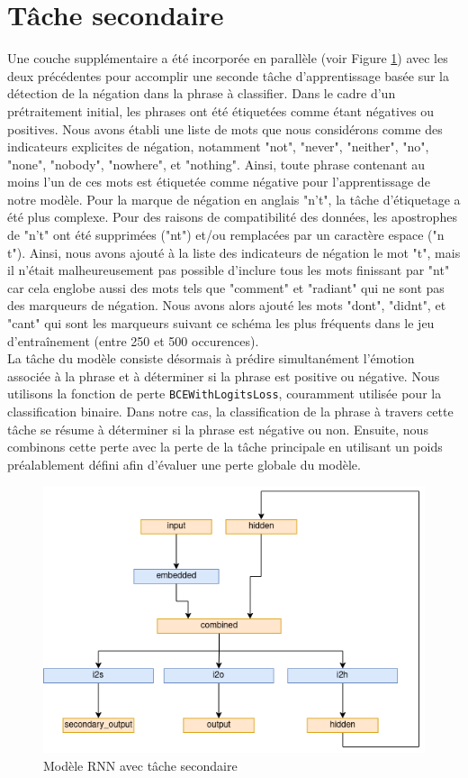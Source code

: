 \documentclass{article}
\begin{document}
\section{Tâche secondaire}
Une couche supplémentaire a été incorporée en parallèle (voir Figure \ref{fig:modele_rnn_with_secondary}) avec les deux précédentes pour accomplir une seconde tâche d'apprentissage basée sur la détection de la négation dans la phrase à classifier. Dans le cadre d'un prétraitement initial, les phrases ont été étiquetées comme étant négatives ou positives. Nous avons établi une liste de mots que nous considérons comme des indicateurs explicites de négation, notamment "not", "never", "neither", "no", "none", "nobody", "nowhere", et "nothing". Ainsi, toute phrase contenant au moins l'un de ces mots est étiquetée comme négative pour l'apprentissage de notre modèle. Pour la marque de négation en anglais "n't", la tâche d'étiquetage a été plus complexe. Pour des raisons de compatibilité des données, les apostrophes de "n't" ont été supprimées ("nt") et/ou remplacées par un caractère espace ("n t"). Ainsi, nous avons ajouté à la liste des indicateurs de négation le mot "t", mais il n'était malheureusement pas possible d'inclure tous les mots finissant par "nt" car cela englobe aussi des mots tels que "comment" et "radiant" qui ne sont pas des marqueurs de négation. Nous avons alors ajouté les mots "dont", "didnt", et "cant" qui sont les marqueurs suivant ce schéma les plus fréquents dans le jeu d'entraînement (entre 250 et 500 occurences).  \\
La tâche du modèle consiste désormais à prédire simultanément l'émotion associée à la phrase et à déterminer si la phrase est positive ou négative. Nous utilisons la fonction de perte \texttt{BCEWithLogitsLoss}, couramment utilisée pour la classification binaire. Dans notre cas, la classification de la phrase à travers cette tâche se résume à déterminer si la phrase est négative ou non. Ensuite, nous combinons cette perte avec la perte de la tâche principale en utilisant un poids préalablement défini afin d'évaluer une perte globale du modèle.

\begin{figure}[H]
    \centering
    \includegraphics[width=0.5\linewidth]{img/modele_with_secondary.png}
    \caption{Modèle RNN avec tâche secondaire}

    \label{fig:modele_rnn_with_secondary}
\end{figure}
\end{document}
